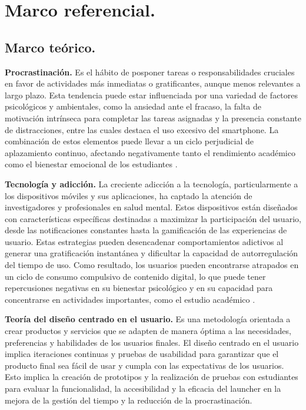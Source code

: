 \section{Marco referencial.}

\subsection{Marco te\'orico.}

\textbf{Procrastinación.} Es el hábito de posponer tareas o responsabilidades cruciales en favor de actividades más inmediatas o gratificantes, aunque menos relevantes a largo plazo. Esta tendencia puede estar influenciada por una variedad de factores psicológicos y ambientales, como la ansiedad ante el fracaso, la falta de motivación intrínseca para completar las tareas asignadas y la presencia constante de distracciones, entre las cuales destaca el uso excesivo del smartphone. La combinación de estos elementos puede llevar a un ciclo perjudicial de aplazamiento continuo, afectando negativamente tanto el rendimiento académico como el bienestar emocional de los estudiantes \cite{Beutel2016}.

\textbf{Tecnología y adicción.} La creciente adicción a la tecnología, particularmente a los dispositivos móviles y sus aplicaciones, ha captado la atención de investigadores y profesionales en salud mental. Estos dispositivos están diseñados con características específicas destinadas a maximizar la participación del usuario, desde las notificaciones constantes hasta la gamificación de las experiencias de usuario. Estas estrategias pueden desencadenar comportamientos adictivos al generar una gratificación instantánea y dificultar la capacidad de autorregulación del tiempo de uso. Como resultado, los usuarios pueden encontrarse atrapados en un ciclo de consumo compulsivo de contenido digital, lo que puede tener repercusiones negativas en su bienestar psicológico y en su capacidad para concentrarse en actividades importantes, como el estudio académico \cite{Montag2019}.

\textbf{Teoría del diseño centrado en el usuario.} Es una metodología orientada a crear productos y servicios que se adapten de manera óptima a las necesidades, preferencias y habilidades de los usuarios finales. El diseño centrado en el usuario implica iteraciones continuas y pruebas de usabilidad para garantizar que el producto final sea fácil de usar y cumpla con las expectativas de los usuarios. Esto implica la creación de prototipos y la realización de pruebas con estudiantes para evaluar la funcionalidad, la accesibilidad y la eficacia del launcher en la mejora de la gestión del tiempo y la reducción de la procrastinación.

